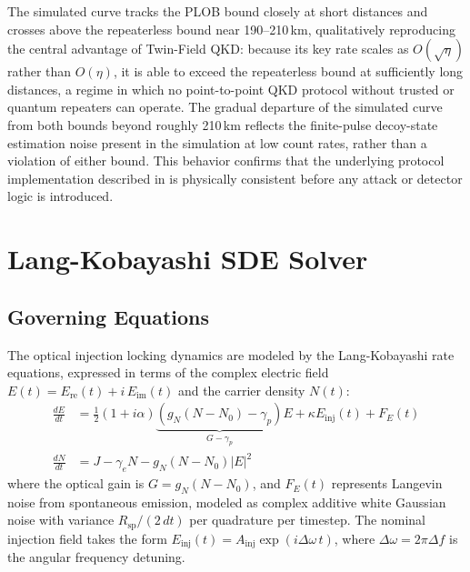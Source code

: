 \documentclass[12pt, a4paper]{report}
\begin{document}
The simulated curve tracks the PLOB bound closely at short distances and crosses above the repeaterless bound near 190--210\,km, qualitatively reproducing the central advantage of Twin-Field QKD: because its key rate scales as $O(\sqrt{\eta})$ rather than $O(\eta)$, it is able to exceed the repeaterless bound at sufficiently long distances, a regime in which no point-to-point QKD protocol without trusted or quantum repeaters can operate. The gradual departure of the simulated curve from both bounds beyond roughly 210\,km reflects the finite-pulse decoy-state estimation noise present in the simulation at low count rates, rather than a violation of either bound. This behavior confirms that the underlying protocol implementation described in  is physically consistent before any attack or detector logic is introduced.

\section{Lang-Kobayashi SDE Solver}\label{sec:lk_solver}

\subsection{Governing Equations}
The optical injection locking dynamics are modeled by the Lang-Kobayashi rate equations, expressed in terms of the complex electric field $E(t) = E_{\text{re}}(t) + i\,E_{\text{im}}(t)$ and the carrier density $N(t)$:
\begin{align}
    \frac{dE}{dt} &= \frac{1}{2}(1 + i\alpha)\underbrace{(g_N(N - N_0) - \gamma_p)}_{G - \gamma_p}E + \kappa E_{\text{inj}}(t) + F_E(t) \\
    \frac{dN}{dt} &= J - \gamma_e N - g_N(N - N_0)|E|^2
\end{align}
where the optical gain is $G = g_N(N - N_0)$, and $F_E(t)$ represents Langevin noise from spontaneous emission, modeled as complex additive white Gaussian noise with variance $R_{\text{sp}} / (2\,dt)$ per quadrature per timestep. The nominal injection field takes the form $E_{\text{inj}}(t) = A_{\text{inj}} \exp(i \Delta\omega\, t)$, where $\Delta\omega = 2\pi \Delta f$ is the angular frequency detuning.
\end{document}

